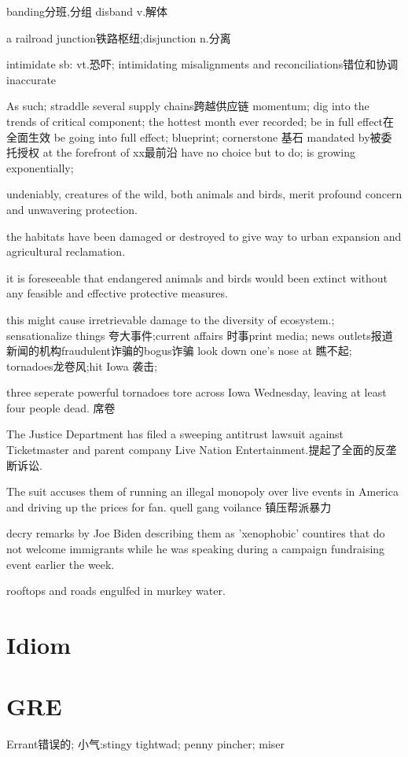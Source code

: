 \documentclass[a4paper,12pt]{article}
\begin{document}
banding分班,分组 disband v.解体

a railroad junction铁路枢纽;disjunction n.分离

intimidate sb: vt.恐吓; intimidating
misalignments and reconciliations错位和协调inaccurate

As such;
straddle several supply chains跨越供应链
momentum;
dig into the trends of critical component;
the hottest month ever recorded;
be in full effect在全面生效 be going into full effect;
blueprint;
cornerstone 基石
mandated by被委托授权
at the forefront of xx最前沿
have no choice but to do;
is growing exponentially;

undeniably, creatures of the wild, both animals and birds, merit profound concern and unwavering protection.

the habitats have been damaged or destroyed to give way to urban expansion and agricultural reclamation.

it is foreseeable that endangered animals and birds would been extinct without any feasible and effective protective measures.

this might cause irretrievable damage to the diversity of ecosystem.;
sensationalize things 夸大事件;current affairs 时事print media;
news outlets报道新闻的机构fraudulent诈骗的bogus诈骗
look down one's nose at 瞧不起;
tornadoes龙卷风;hit Iowa 袭击;

three seperate powerful tornadoes tore across Iowa Wednesday, leaving at least four people dead. 席卷

The Justice Department has filed a sweeping antitrust lawsuit against Ticketmaster and parent company Live Nation Entertainment.提起了全面的反垄断诉讼.

The suit accuses them of running an illegal monopoly over live events in America and driving up the prices for fan.
quell gang voilance 镇压帮派暴力

decry remarks by Joe Biden describing them as 'xenophobic' countires that do not welcome immigrants while he was speaking during a campaign fundraising event earlier the week.

rooftops and roads engulfed in murkey water.

\section{Idiom}
\section{GRE}
Errant错误的;
小气:stingy tightwad; penny pincher; miser
\end{document}
